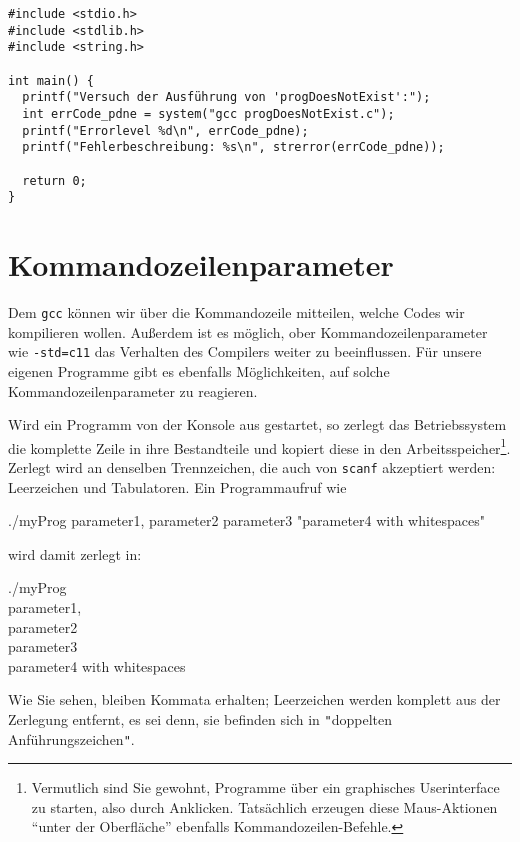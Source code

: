 \begin{codebox}
\begin{verbatim}
#include <stdio.h>
#include <stdlib.h>
#include <string.h>
 
int main() {
  printf("Versuch der Ausführung von 'progDoesNotExist':");
  int errCode_pdne = system("gcc progDoesNotExist.c");
  printf("Errorlevel %d\n", errCode_pdne);  
  printf("Fehlerbeschreibung: %s\n", strerror(errCode_pdne));
  
  return 0;
}
\end{verbatim}
\end{codebox}

\section{Kommandozeilenparameter} \label{sec:cmdlineParams}
Dem \texttt{gcc} können wir über die Kommandozeile mitteilen, welche Codes wir kompilieren wollen. Außerdem ist es möglich, ober Kommandozeilenparameter wie \texttt{-std=c11} das Verhalten des Compilers weiter zu beeinflussen. Für unsere eigenen Programme gibt es ebenfalls Möglichkeiten, auf solche Kommandozeilenparameter zu reagieren.

Wird ein Programm von der Konsole aus gestartet, so zerlegt das Betriebssystem die komplette Zeile in ihre Bestandteile und kopiert diese in den Arbeitsspeicher\footnote{Vermutlich sind Sie gewohnt, Programme über ein graphisches Userinterface zu starten, also durch Anklicken. Tatsächlich erzeugen diese Maus-Aktionen \enquote{unter der Oberfläche} ebenfalls Kommandozeilen-Befehle.}. Zerlegt wird an denselben Trennzeichen, die auch von \texttt{scanf} akzeptiert werden: Leerzeichen und Tabulatoren. Ein Programmaufruf wie
\begin{cmdbox}
./myProg parameter1, parameter2        parameter3 "parameter4 with whitespaces"
\end{cmdbox}
wird damit zerlegt in:
\begin{cmdbox}
./myProg\\
parameter1,\\
parameter2 \\
parameter3 \\
parameter4 with whitespaces
\end{cmdbox}

Wie Sie sehen, bleiben Kommata erhalten; Leerzeichen werden komplett aus der Zerlegung entfernt, es sei denn, sie befinden sich in \texttt{"}doppelten Anführungszeichen\texttt{"}.

